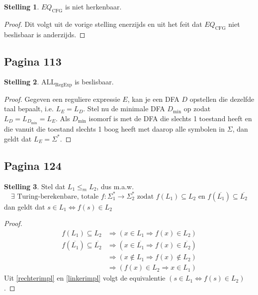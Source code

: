 \documentclass[kulak]{kulakarticle}
\newcommand{\CFG}{\text{CFG}}
\theoremstyle{definition}
\newtheorem*{stelling}{Stelling}
\begin{document}
	\begin{stelling}
		\(EQ_\CFG\) is niet herkenbaar.
	\end{stelling}

	\begin{proof}
		Dit volgt uit de vorige stelling enerzijds en uit het feit dat \(EQ_\CFG\) niet beslisbaar is anderzijds.
	\end{proof}

	\subsection*{Pagina 113}

	\begin{stelling}
		\(\text{ALL}_\text{RegExp}\) is beslisbaar.
	\end{stelling}

	\begin{proof}
		Gegeven een reguliere expressie \(E\), kan je een DFA \(D\) opstellen die dezelfde taal bepaalt, i.e. \(L_E=L_D\). Stel nu de minimale DFA \(D_{\min}\) op zodat \(L_D=L_{D_{\min}}=L_E\). Als \(D_{\min}\) isomorf is met de DFA die slechts 1 toestand heeft en die vanuit die toestand slechts 1 boog heeft met daarop alle symbolen in \(\Sigma\), dan geldt dat \(L_E=\Sigma^*\).
	\end{proof}

	\subsection*{Pagina 124}

	\begin{stelling}
		Stel dat \(L_1 \leq_m L_2\), dus m.a.w. \[ \exists \text{ Turing-berekenbare, totale } f : \Sigma_1^*\to\Sigma_2^* \text{ zodat } f(L_1) \subseteq L_2 \text{ en } f(\overline{L_1}) \subseteq \overline{L_2} \] dan geldt dat \(s\in L_1 \Leftrightarrow f(s)\in L_2\)
	\end{stelling}

	\begin{proof}
		\begin{align}
			f(L_1) \subseteq L_2                       & \Rightarrow (x \in L_1 \Rightarrow f(x) \in L_2) \label{rechterimpl} \\
			f(\overline{L_1}) \subseteq \overline{L_2} & \Rightarrow (x \in \overline{L_1} \Rightarrow f(x) \in \overline{L_2})\nonumber \\
														& \Rightarrow (x \notin L_1 \Rightarrow f(x) \notin L_2)\nonumber \\
														& \Rightarrow (f(x) \in L_2 \Rightarrow x \in L_1) \label{linkerimpl}
		\end{align}
		Uit \eqref{rechterimpl} en \eqref{linkerimpl} volgt de equivalentie \((s\in L_1 \Leftrightarrow f(s)\in L_2)\).
	\end{proof}
\end{document}
